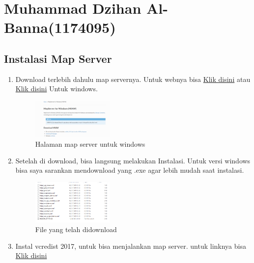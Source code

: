 \section{Muhammad Dzihan Al-Banna(1174095)}
\subsection{Instalasi Map Server}
\begin{enumerate}
    \item Download terlebih dahulu map servernya. Untuk webnya bisa \href{https://mapserver.org/}{Klik disini} atau \href{https://ms4w.com/}{Klik disini} Untuk windows.
    \hfill\break
    \begin{figure}[H]
		\includegraphics[width=4cm]{figures/1174095/4/Capture.png}
		\centering
		\caption{Halaman map server untuk windows}
    \end{figure}
    \item Setelah di download, bisa langsung melakukan Instalasi. Untuk versi windows bisa saya sarankan mendownload yang .exe agar lebih mudah saat instalasi.
    \hfill\break
    \begin{figure}[H]
		\includegraphics[width=4cm]{figures/1174095/4/Capture2.png}
		\centering
		\caption{File yang telah didownload}
    \end{figure}
    \item Instal vcredist 2017, untuk bisa menjalankan map server. untuk linknya bisa \href{https://support.microsoft.com/id-id/help/2977003/the-latest-supported-visual-c-downloads}{Klik disini}
\end{enumerate}
